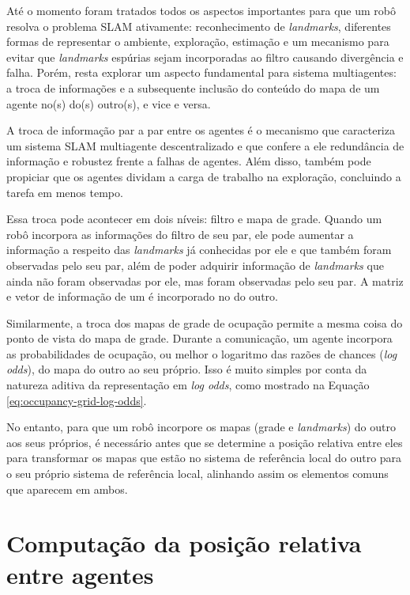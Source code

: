 Até o momento foram tratados todos os aspectos importantes para que 
um robô resolva o problema SLAM ativamente: reconhecimento de 
\textit{landmarks}, diferentes formas de representar o ambiente, 
exploração, estimação e um mecanismo para evitar que \textit{landmarks} 
espúrias sejam incorporadas ao filtro causando divergência e falha. 
Porém, resta explorar um aspecto fundamental para sistema multiagentes: 
a troca de informações e a subsequente inclusão do conteúdo do mapa de um agente 
no(s) do(s) outro(s), e vice e versa.

A troca de informação par a par entre os agentes é o mecanismo que 
caracteriza um sistema SLAM multiagente descentralizado e que confere 
a ele redundância de informação e robustez frente a falhas de agentes. 
Além disso, também pode propiciar que os agentes dividam a carga de 
trabalho na exploração, concluindo a tarefa em menos tempo.

Essa troca pode acontecer em dois níveis: filtro e mapa de grade. 
Quando um robô incorpora as informações do filtro de seu par, 
ele pode aumentar a informação a respeito das \textit{landmarks} já 
conhecidas por ele e que também foram observadas pelo seu par, além de poder 
adquirir informação de \textit{landmarks} que ainda não foram 
observadas por ele, mas foram observadas pelo seu par. A matriz e vetor 
de informação de um é incorporado no do outro.

Similarmente, a troca dos mapas de grade de ocupação permite a mesma 
coisa do ponto de vista do mapa de grade. Durante a comunicação, um 
agente incorpora as probabilidades de ocupação, ou melhor o logaritmo 
das razões de chances (\textit{log odds}), do mapa do outro ao seu 
próprio. Isso é muito simples por conta da natureza aditiva da 
representação em \textit{log odds}, como mostrado na Equação \ref{eq:occupancy-grid-log-odds}.

No entanto, para que um robô incorpore os mapas (grade e \textit{landmarks}) do outro aos seus próprios, é necessário antes que se determine a posição relativa entre eles para transformar os 
mapas que estão no sistema de referência local do outro para o seu 
próprio sistema de referência local, alinhando assim os elementos comuns 
que aparecem em ambos.

\section{Computação da posição relativa entre agentes}
\label{sec:point-cloud-registration}

